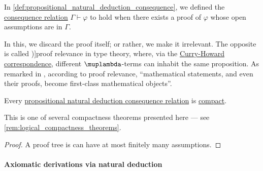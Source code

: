 \begin{concept}\label{con:proof_relevance}
  In \cref{def:propositional_natural_deduction_consequence}, we defined the \hyperref[def:consequence_relation]{consequence relation} \( \Gamma \vdash \varphi \) to hold when there exists a proof of \( \varphi \) whose open assumptions are in \( \Gamma \).

  In this, we discard the proof itself; or rather, we make it irrelevant. The opposite is called \term[en=proof relevance (\cite[9]{UnivalentFoundationsProgram2013HoTT})]{proof relevance} in type theory, where, via the \hyperref[con:curry_howard_correspondence]{Curry-Howard correspondence}, different \( \muplambda \)-terms can inhabit the same proposition. As remarked in \cite[9]{UnivalentFoundationsProgram2013HoTT}, according to proof relevance, \enquote{mathematical statements, and even their proofs, become first-class mathematical objects}.
\end{concept}

\begin{proposition}\label{thm:propositional_natural_deduction_derivation_compact}
  Every \hyperref[def:propositional_natural_deduction_consequence]{propositional natural deduction consequence relation} is \hyperref[def:consequence_relation/compactness]{compact}.
\end{proposition}
\begin{comments}
  \item This is one of several compactness theorems presented here --- see \cref{rem:logical_compactness_theorems}.
\end{comments}
\begin{proof}
  A proof tree is can have at most finitely many assumptions.
\end{proof}

\paragraph{Axiomatic derivations via natural deduction}

